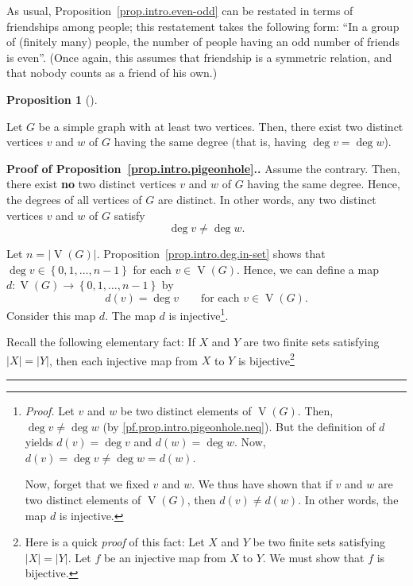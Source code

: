 \documentclass[numbers=enddot,12pt,final,onecolumn,notitlepage]{scrartcl}%
\theoremstyle{definition}
\newtheorem{prop}[theo]{Proposition}
\newenvironment{proposition}[1][]
{\begin{prop}[#1]\begin{leftbar}}
{\end{leftbar}\end{prop}}
\newenvironment{proof}[1][Proof]{\noindent\textbf{#1.} }{\ \rule{0.5em}{0.5em}}
\newcommand{\set}[1]{\left\{ #1 \right\}}
\newcommand{\abs}[1]{\left| #1 \right|}
\newcommand{\tup}[1]{\left( #1 \right)}
\newcommand{\verts}[1]{\operatorname{V}\left( #1 \right)}
\begin{document}
As usual, Proposition~\ref{prop.intro.even-odd} can be restated in
terms of friendships among people; this restatement takes the
following form: ``In a group of (finitely many) people, the number of
people having an odd number of friends is even''. (Once again, this
assumes that friendship is a symmetric relation, and that nobody
counts as a friend of his own.)

\begin{proposition} \label{prop.intro.pigeonhole}
Let $G$ be a simple graph with at least two vertices.
Then, there exist two distinct vertices $v$ and $w$ of $G$ having the
same degree (that is, having $\deg v = \deg w$).
\end{proposition}

\begin{proof}[Proof of Proposition~\ref{prop.intro.pigeonhole}.]
Assume the contrary. Then, there exist \textbf{no} two distinct
vertices $v$ and $w$ of $G$ having the same degree. Hence, the degrees
of all vertices of $G$ are distinct. In other words, any two distinct
vertices $v$ and $w$ of $G$ satisfy
\begin{equation}
\deg v \neq \deg w .
\label{pf.prop.intro.pigeonhole.neq}
\end{equation}

Let $n = \abs{\verts{G}}$. Proposition~\ref{prop.intro.deg.in-set}
shows that $\deg v \in \set{0, 1, \ldots, n-1}$ for each
$v \in \verts{G}$. Hence, we can define a map
$d : \verts{G} \to \set{0, 1, \ldots, n-1}$ by
\[
d\tup{v} = \deg v \qquad \text{for each } v \in \verts{G} .
\]
Consider this map $d$. The map $d$ is
injective\footnote{\textit{Proof.} Let $v$ and $w$ be two distinct
elements of $\verts{G}$. Then, $\deg v \neq \deg w$
(by \eqref{pf.prop.intro.pigeonhole.neq}). But
the definition of $d$ yields
$d\tup{v} = \deg v$ and $d\tup{w} = \deg w$. Now,
$d\tup{v} = \deg v \neq \deg w = d\tup{w}$.

Now, forget that we fixed $v$ and $w$. We thus have shown that if $v$
and $w$ are two distinct elements of $\verts{G}$, then
$d\tup{v} \neq d\tup{w}$. In other words, the map $d$ is injective.}.

Recall the following elementary fact: If $X$ and $Y$ are two finite
sets satisfying $\abs{X} = \abs{Y}$, then each injective map from $X$
to $Y$ is bijective\footnote{Here is a quick \textit{proof} of this
fact: Let $X$ and $Y$ be two finite sets satisfying $\abs{X} =
\abs{Y}$. Let $f$ be an injective map from $X$ to $Y$. We must show
that $f$ is bijective.

}
\end{proof}
\end{document}
